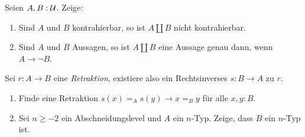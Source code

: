 \documentclass{uebung}
\begin{document}

\begin{exercise}
  Seien $A,B:\mathcal{U}$.
  Zeige:
  \begin{enumerate}
    \item Sind $A$ und $B$ kontrahierbar, so ist $A \amalg B$ nicht kontrahierbar.
    \item Sind $A$ und $B$ Aussagen, so ist $A \amalg B$ eine Aussage genau dann, wenn $A \to \neg B$.
  \end{enumerate}
\end{exercise}

\begin{exercise}
  Sei $r:A \to B$ eine \emph{Retraktion}, existiere also ein Rechtsinverses $s:B \to A$ zu $r$.
  \begin{enumerate}
    \item Finde eine Retraktion $s(x) =_A s(y) \to x=_B y$ für alle $x,y:B$.
    \item Sei $n\geq -2$ ein Abschneidungslevel und $A$ ein $n$-Typ.
      Zeige, dass $B$ ein $n$-Typ ist.
  \end{enumerate}
\end{exercise}
\end{document}
